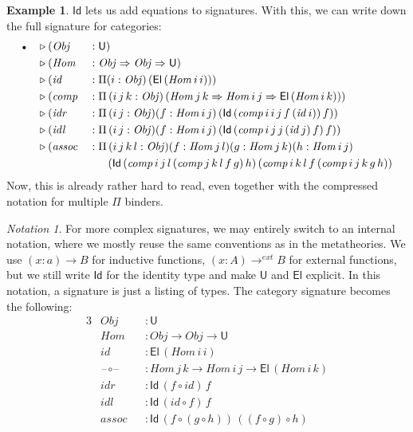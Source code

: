 \documentclass[12pt,a4paper,twoside,openany]{book}
\theoremstyle{remark}
\newtheorem{notation}{Notation}
\theoremstyle{definition}
\newtheorem{myexample}{Example}
\theoremstyle{theorem}
\newcommand{\mi}[1]{\mathit{#1}}
\newcommand{\U}{\mathsf{U}}
\newcommand{\El}{\mathsf{El}}
\newcommand{\Id}{\mathsf{Id}}
\newcommand{\blank}{\mathord{\hspace{1pt}\text{--}\hspace{1pt}}}
\newcommand{\ext}{\triangleright}
\newcommand{\emptycon}{\scaleobj{.75}\bullet}
\newcommand{\funi}{\Rightarrow}
\begin{document}
\begin{myexample} $\Id$ lets us add equations to signatures. With this, we can write down the full
signature for categories:
\begin{alignat*}{3}
  & \emptycon &&\ext (\mi{Obj}   &&: \U)\\
  &           &&\ext (\mi{Hom}   &&: \mi{Obj} \funi \mi{Obj} \funi \U)\\
  &           &&\ext (\mi{id}    &&: \Pi(i : \mi{Obj})\,(\El\,(\mi{Hom}\,i\,i)))\\
  &           &&\ext (\mi{comp}  &&: \Pi\,(i\,j\,k : \mi{Obj})\,(\mi{Hom}\,j\,k \funi \mi{Hom}\,i\,j \funi \El\,(\mi{Hom}\,i\,k)))\\
  &           &&\ext (\mi{idr}   &&: \Pi\,(i\,j : \mi{Obj})(f : \mi{Hom}\,i\,j)\,(\Id\,(\mi{comp}\,i\,i\,j\,f\,(\mi{id}\,i))\,f))\\
  &           &&\ext (\mi{idl}   &&: \Pi\,(i\,j : \mi{Obj})(f : \mi{Hom}\,i\,j)\,(\Id\,(\mi{comp}\,i\,j\,j\,(\mi{id}\,j)\,f)\,f))\\
  &           &&\ext (\mi{assoc} &&: \Pi\,(i\,j\,k\,l : \mi{Obj})(f : \mi{Hom}\,j\,l)(g : \mi{Hom}\,j\,k)(h : \mi{Hom}\,i\,j)\\
  &           && &&\hspace{1.7em} (\Id
                 \,(\mi{comp}\,i\,j\,l\,(\mi{comp}\,j\,k\,l\,f\,g)\,h)
                 \,(\mi{comp}\,i\,k\,l\,f\,(\mi{comp}\,i\,j\,k\,g\,h))
\end{alignat*}
Now, this is already rather hard to read, even together with the compressed
notation for multiple $\Pi$ binders.
\begin{notation}
For more complex signatures, we may entirely switch to an internal notation,
where we mostly reuse the same conventions as in the metatheories. We use $(x :
a) \to B$ for inductive functions, $(x : A) \to^{ext} B$ for external functions,
but we still write $\Id$ for the identity type and make $\U$ and $\El$
explicit. In this notation, a signature is just a listing of types. The category
signature becomes the following:
\begin{alignat*}{3}
  & \mi{Obj} &&: \U\\
  & \mi{Hom} &&: \mi{Obj} \to \mi{Obj} \to \U\\
  & \mi{id}  &&: \El\,(\mi{Hom}\,i\,i)\\
  & \mi{\blank\!\circ\!\blank} &&: \mi{Hom}\,j\,k \to \mi{Hom}\,i\,j \to \El\,(\mi{Hom}\,i\,k)\\
  & \mi{idr} &&: \Id\,(f \circ \mi{id})\,f\\
  & \mi{idl} &&: \Id\,(\mi{id} \circ f)\,f\\
  & \mi{assoc} &&: \Id\,(f \circ (g \circ h))\,((f \circ g) \circ h)
\end{alignat*}
\end{notation}
\end{myexample}
\end{document}
